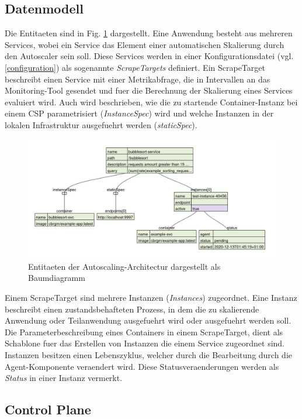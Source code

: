 \documentclass[runningheads]{llncs}
\begin{document}
\subsection{Datenmodell}

Die Entitaeten sind in Fig. \ref{datenmodell} dargestellt. Eine Anwendung besteht aus mehreren Services, wobei ein Service das Element einer automatischen Skalierung durch den Autoscaler sein soll. Diese Services werden in einer Konfigurationsdatei (vgl. \ref{configuration}) als sogenannte \textit{ScrapeTargets} definiert. Ein ScrapeTarget beschreibt einen Service mit einer Metrikabfrage, die in Intervallen an das Monitoring-Tool gesendet und fuer die Berechnung der Skalierung eines Services evaluiert wird. Auch wird beschrieben, wie die zu startende Container-Instanz bei einem CSP parametrisiert (\textit{InstanceSpec}) wird und welche Instanzen in der lokalen Infrastruktur ausgefuehrt werden (\textit{staticSpec}).

\begin{figure}[h]
	\centering
	\includegraphics[width=1.0\linewidth,scale=1.0]{images/datamodel.png}
	\caption{Entitaeten der Autoscaling-Architectur dargestellt als Baumdiagramm}
	\label{datenmodell}
\end{figure}

Einem ScrapeTarget sind mehrere Instanzen (\textit{Instances}) zugeordnet. Eine Instanz beschreibt einen zustandsbehafteten Prozess, in dem die zu skalierende Anwendung oder Teilanwendung ausgefuehrt wird oder ausgefuehrt werden soll. Die Parameterbeschreibung eines Containers  in einem ScrapeTarget,  dient als Schablone fuer das Erstellen von Instanzen die einem Service zugeordnet sind. Instanzen besitzen einen Lebenszyklus, welcher durch die Bearbeitung durch die Agent-Komponente veraendert wird. Diese Statusveraenderungen werden als \textit{Status} in einer Instanz vermerkt.
	
\subsection{Control Plane} \label{control_plane}
\end{document}
